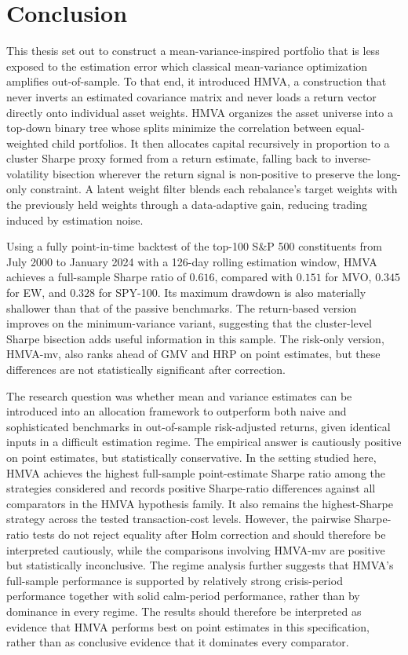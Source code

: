 \documentclass[12pt]{article}
\begin{document}
\section{Conclusion}
\label{sec:conc}

This thesis set out to construct a mean-variance-inspired portfolio that is less exposed to the estimation error which classical mean-variance optimization amplifies out-of-sample. To that end, it introduced HMVA, a construction that never inverts an estimated covariance matrix and never loads a return vector directly onto individual asset weights. HMVA organizes the asset universe into a top-down binary tree whose splits minimize the correlation between equal-weighted child portfolios. It then allocates capital recursively in proportion to a cluster Sharpe proxy formed from a return estimate, falling back to inverse-volatility bisection wherever the return signal is non-positive to preserve the long-only constraint. A latent weight filter blends each rebalance's target weights with the previously held weights through a data-adaptive gain, reducing trading induced by estimation noise.

Using a fully point-in-time backtest of the top-100 S\&P 500 constituents from July 2000 to January 2024 with a 126-day rolling estimation window, HMVA achieves a full-sample Sharpe ratio of $0.616$, compared with $0.151$ for MVO, $0.345$ for EW, and $0.328$ for SPY-100. Its maximum drawdown is also materially shallower than that of the passive benchmarks. The return-based version improves on the minimum-variance variant, suggesting that the cluster-level Sharpe bisection adds useful information in this sample. The risk-only version, HMVA-mv, also ranks ahead of GMV and HRP on point estimates, but these differences are not statistically significant after correction. 

The research question was whether mean and variance estimates can be introduced into an allocation framework to outperform both naive and sophisticated benchmarks in out-of-sample risk-adjusted returns, given identical inputs in a difficult estimation regime. The empirical answer is cautiously positive on point estimates, but statistically conservative. In the setting studied here, HMVA achieves the highest full-sample point-estimate Sharpe ratio among the strategies considered and records positive Sharpe-ratio differences against all comparators in the HMVA hypothesis family. It also remains the highest-Sharpe strategy across the tested transaction-cost levels. However, the pairwise Sharpe-ratio tests do not reject equality after Holm correction and should therefore be interpreted cautiously, while the comparisons involving HMVA-mv are positive but statistically inconclusive. The regime analysis further suggests that HMVA's full-sample performance is supported by relatively strong crisis-period performance together with solid calm-period performance, rather than by dominance in every regime. The results should therefore be interpreted as evidence that HMVA performs best on point estimates in this specification, rather than as conclusive evidence that it dominates every comparator.
\end{document}
